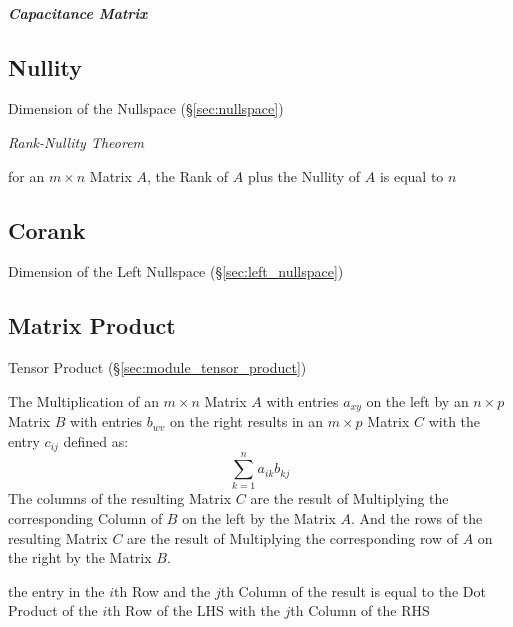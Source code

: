 \subparagraph{Capacitance Matrix}\label{sec:capacitance_matrix}\hfill



\subsection{Nullity}\label{sec:nullity}

Dimension of the Nullspace (\S\ref{sec:nullspace})

\emph{Rank-Nullity Theorem}

for an $m \times n$ Matrix $A$, the Rank of $A$ plus the Nullity of $A$ is
equal to $n$



\subsection{Corank}\label{sec:corank}

Dimension of the Left Nullspace (\S\ref{sec:left_nullspace})



\subsection{Matrix Product}\label{sec:matrix_product}

\fist Tensor Product (\S\ref{sec:module_tensor_product})

The Multiplication of an $m \times n$ Matrix $A$ with entries $a_{xy}$
on the left by an $n \times p$ Matrix $B$ with entries $b_{wv}$ on the
right results in an $m \times p$ Matrix $C$ with the entry $c_{ij}$
defined as:
\[
  \sum_{k=1}^n a_{ik} b_{kj}
\]
The columns of the resulting Matrix $C$ are the result of Multiplying
the corresponding Column of $B$ on the left by the Matrix $A$. And the
rows of the resulting Matrix $C$ are the result of Multiplying the
corresponding row of $A$ on the right by the Matrix $B$.

the entry in the $i$th Row and the $j$th Column of the result is equal to the
Dot Product of the $i$th Row of the LHS with the $j$th Column of the RHS

